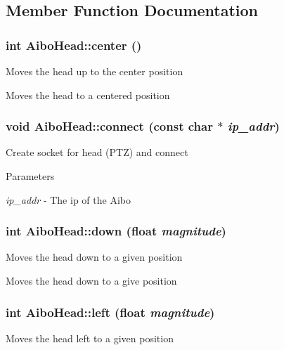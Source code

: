\subsection{Member Function Documentation}
\hypertarget{classAiboHead_a2e754379dcba417ebd438c40b437db76}{
\subsubsection[{center}]{\setlength{\rightskip}{0pt plus 5cm}int AiboHead::center ()}}
\label{classAiboHead_a2e754379dcba417ebd438c40b437db76}
Moves the head up to the center position

Moves the head to a centered position \hypertarget{classAiboHead_a5fef344c99e421b7c704099628ca3542}{
\subsubsection[{connect}]{\setlength{\rightskip}{0pt plus 5cm}void AiboHead::connect (const char $\ast$ {\em ip\_\-addr})}}
\label{classAiboHead_a5fef344c99e421b7c704099628ca3542}
Create socket for head (PTZ) and connect 
\begin{DoxyParams}{Parameters}
\item[{\em ip\_\-addr}]-\/ The ip of the Aibo \end{DoxyParams}
\hypertarget{classAiboHead_a60bd059ca7a58ee2b3ee95011150ea89}{
\subsubsection[{down}]{\setlength{\rightskip}{0pt plus 5cm}int AiboHead::down (float {\em magnitude})}}
\label{classAiboHead_a60bd059ca7a58ee2b3ee95011150ea89}
Moves the head down to a given position

Moves the head down to a give position \hypertarget{classAiboHead_a4821a0ccff77b881636aec49703a3683}{
\subsubsection[{left}]{\setlength{\rightskip}{0pt plus 5cm}int AiboHead::left (float {\em magnitude})}}
\label{classAiboHead_a4821a0ccff77b881636aec49703a3683}
Moves the head left to a given position

